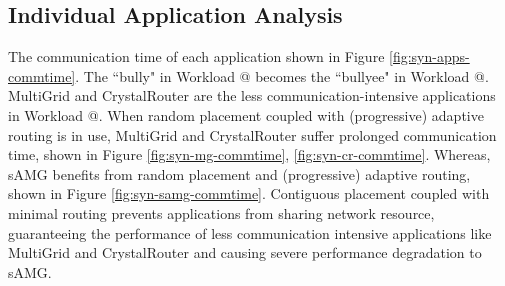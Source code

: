 \documentclass[conference,compsoc]{IEEEtran}
\makeatletter
\newcommand{\Rmnum}[1]{\expandafter\@slowromancap\romannumeral #1@}
\makeatother
\begin{document}
\subsection{Individual Application Analysis}
\label{sec: workload-2 app analysis}

The communication time of each application shown in Figure \ref{fig:syn-apps-commtime}. The ``bully" in Workload \Rmnum{1} becomes the ``bullyee" in Workload \Rmnum{2}. MultiGrid and CrystalRouter are the less communication-intensive applications in Workload \Rmnum{2}.  When random placement coupled with (progressive) adaptive routing is in use, MultiGrid and CrystalRouter suffer prolonged communication time, shown in Figure \ref{fig:syn-mg-commtime}, \ref{fig:syn-cr-commtime}. Whereas, sAMG benefits from random placement and (progressive) adaptive routing, shown in Figure \ref{fig:syn-samg-commtime}. Contiguous placement coupled with minimal routing prevents applications from sharing network resource, guaranteeing the performance of less communication intensive applications like MultiGrid and CrystalRouter and causing severe performance degradation to sAMG.
\end{document}
